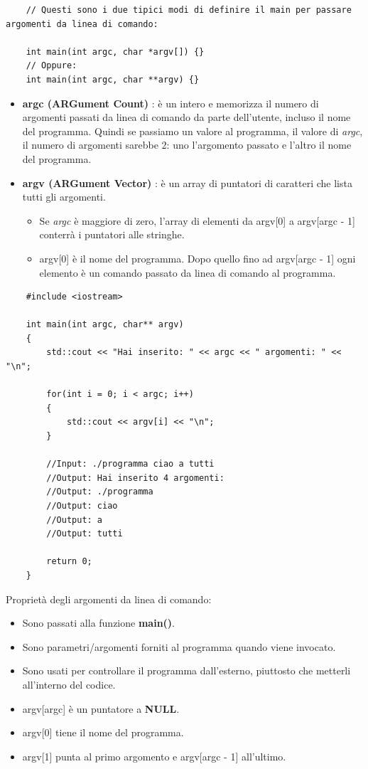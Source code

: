 \begin{lstlisting}
	// Questi sono i due tipici modi di definire il main per passare argomenti da linea di comando:
	
	int main(int argc, char *argv[]) {}
	// Oppure:
	int main(int argc, char **argv) {} 
\end{lstlisting}

\begin{itemize}
	\item \textsf{\small \textbf{argc (ARGument Count)} : è un intero e memorizza il numero di argomenti passati da linea di comando da parte dell'utente, incluso il nome del programma. Quindi se passiamo un valore al programma, il valore di \emph{argc}, il numero di argomenti sarebbe 2: uno l'argomento passato e l'altro il nome del programma.} \\
	\item \textsf{\small \textbf{argv (ARGument Vector)} : è un array di puntatori di caratteri che lista tutti gli argomenti.} \\
	\begin{itemize}
		\item \textsf{\small Se \emph{argc} è maggiore di zero, l'array di elementi da argv[0] a argv[argc - 1] conterrà i puntatori alle stringhe.}
		\item \textsf{\small argv[0] è il nome del programma. Dopo quello fino ad argv[argc - 1] ogni elemento è un comando passato da linea di comando al programma.}
	\end{itemize}
\end{itemize}

\begin{lstlisting}
	#include <iostream>
	
	int main(int argc, char** argv)
	{
		std::cout << "Hai inserito: " << argc << " argomenti: " << "\n";
		
		for(int i = 0; i < argc; i++)
		{
			std::cout << argv[i] << "\n";
		}
	
		//Input: ./programma ciao a tutti
		//Output: Hai inserito 4 argomenti:
		//Output: ./programma
		//Output: ciao
		//Output: a
		//Output: tutti
		
		return 0;
	}
\end{lstlisting}

\textsf{\small Proprietà degli argomenti da linea di comando: } \\

\begin{itemize}
	\item \textsf{\small Sono passati alla funzione \textbf{main()}.}
	\item \textsf{\small Sono parametri/argomenti forniti al programma quando viene invocato.}
	\item \textsf{\small Sono usati per controllare il programma dall'esterno, piuttosto che metterli all'interno del codice.}
	\item \textsf{\small argv[argc] è un puntatore a \textbf{NULL}.}
	\item \textsf{\small argv[0] tiene il nome del programma.}
	\item \textsf{\small argv[1] punta al primo argomento e argv[argc - 1] all'ultimo.}
\end{itemize}

